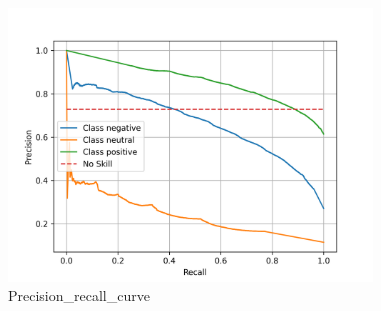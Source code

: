 \documentclass{article}%
\begin{document}
{%
\newpage%
\raggedright%


\begin{figure}[h!]%
\centering%
\includegraphics[width=365px]{./report/Learning/Kneighbors_Classifier/Recall-Precision.png}%
\caption{Precision\_recall\_curve}%
\end{figure}

%
}%
\pagestyle{firstpage}%
\newpage%
\end{document}
